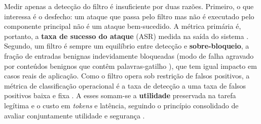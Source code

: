 Medir apenas a detecção do filtro é insuficiente por duas razões. Primeiro, o
que interessa é o desfecho: um ataque que passa pelo filtro mas não é executado
pelo componente principal não é um ataque bem-sucedido. A métrica primária é,
portanto, a \textbf{taxa de sucesso do ataque} (ASR) medida na saída do sistema
\cite{yi2025bipia}. Segundo, um filtro é sempre um equilíbrio entre detecção e
\textbf{sobre-bloqueio}, a fração de entradas benignas indevidamente
bloqueadas (modo de falha agravado por conteúdos benignos que contêm
palavras-gatilho \cite{li2024injecguard}), que tem igual impacto em casos
reais de aplicação. Como o filtro opera sob restrição de
falsos positivos, a métrica de classificação operacional é a taxa
de detecção a uma taxa de falsos positivos baixa e fixa \cite{jacob2025promptshield}.
A esses somam-se a \textbf{utilidade} preservada na tarefa legítima e o custo em
\textit{tokens} e latência, seguindo o princípio consolidado de avaliar
conjuntamente utilidade e segurança \cite{debenedetti2024agentdojo}.
